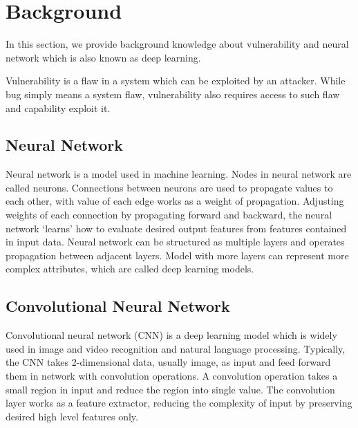 \section{Background}
\label{section:background}

In this section, we provide background knowledge about vulnerability and neural network which is also known as deep learning.

Vulnerability is a flaw in a system which can be exploited by an attacker.
While bug simply means a system flaw, vulnerability also requires access to such flaw and capability exploit it.


\subsection{Neural Network}

Neural network is a model used in machine learning. Nodes in neural network are called neurons.
Connections between neurons are used to propagate values to each other, with value of each edge works as a weight of propagation.
Adjusting weights of each connection by propagating forward and backward, the neural network `learns' how to evaluate desired output features from features contained in input data.
Neural network can be structured as multiple layers and operates propagation between adjacent layers.
Model with more layers can represent more complex attributes, which are called deep learning models.

\subsection{Convolutional Neural Network}

Convolutional neural network (CNN) is a deep learning model which is widely used in image and video recognition and natural language processing.
Typically, the CNN takes 2-dimensional data, usually image, as input and feed forward them in network with convolution operations.
A convolution operation takes a small region in input and reduce the region into single value.
The convolution layer works as a feature extractor, reducing the complexity of input by preserving desired high level features only.
